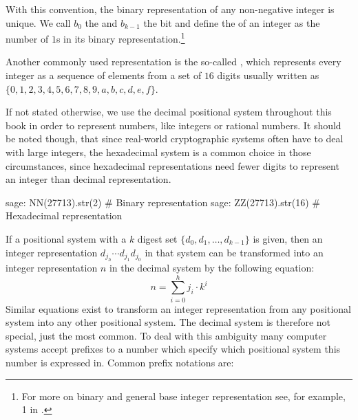 With this convention, the binary representation of any non-negative integer is unique. We call $b_0$ the  and $b_{k-1}$ the  bit and define the  of an integer as the number of $1$s in its binary representation.\footnote{For more on binary and general base integer representation see, for example, \chaptname{} 1 in \cite{mignotte-1992}.}

Another commonly used representation is the so-called , which represents every integer as a sequence of elements from a set of $16$ digits usually written as $\{0,1,2,3,4,5,6,7,8,9,a,b,c,d,e,f\}$. 

If not stated otherwise, we use the decimal positional system throughout this book in order to represent numbers, like integers or rational numbers. It should be noted though, that since real-world cryptographic systems often have to deal with large integers, the hexadecimal system is a common choice in those circumstances, since hexadecimal representations need fewer digits to represent an integer than decimal representation.  
\begin{sagecommandline}
sage: NN(27713).str(2) # Binary representation
sage: ZZ(27713).str(16) # Hexadecimal representation
\end{sagecommandline}
If a positional system with a $k$ digest set $\{d_0,d_1,\ldots, d_{k-1}\}$ is given, then an integer representation $d_{j_h}\cdots d_{j_1} d_{j_0}$ in that system can be transformed into 
an integer representation $n$ in the decimal system by the following equation:
\begin{equation}
\label{eq:from-k-digits-to-deci}
n = \sum_{i=0}^h j_i\cdot k^{i}
\end{equation}
Similar equations exist to transform an integer representation from any positional system into any other positional system. The decimal system is therefore not special, just the most common. To deal with this ambiguity many computer systems accept prefixes to a number which specify which positional system this number is expressed in. Common prefix notations are:
 
